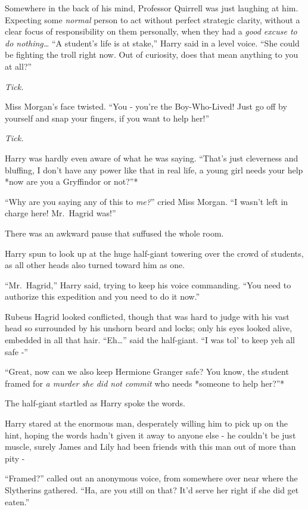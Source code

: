 Somewhere in the back of his mind, Professor Quirrell was just laughing
at him. Expecting some \emph{normal} person to act without perfect
strategic clarity, without a clear focus of responsibility on them
personally, when they had a \emph{good excuse to do nothing\ldots{}} ``A
student's life is at stake,'' Harry said in a level voice. ``She could
be fighting the troll right now. Out of curiosity, does that mean
anything to you at all?''

\emph{Tick.}

Miss Morgan's face twisted. ``You - you're the Boy-Who-Lived! Just go
off by yourself and snap your fingers, if you want to help her!''

\emph{Tick.}

Harry was hardly even aware of what he was saying. ``That's just
cleverness and bluffing, I don't have any power like that in real life,
a young girl needs your help *now are you a Gryffindor or not?''*

``Why are you saying any of this to \emph{me?}'' cried Miss Morgan. ``I
wasn't left in charge here! Mr.~Hagrid was!''

There was an awkward pause that suffused the whole room.

Harry spun to look up at the huge half-giant towering over the crowd of
students, as all other heads also turned toward him as one.

``Mr.~Hagrid,'' Harry said, trying to keep his voice commanding. ``You
need to authorize this expedition and you need to do it now.''

Rubeus Hagrid looked conflicted, though that was hard to judge with his
vast head so surrounded by his unshorn beard and locks; only his eyes
looked alive, embedded in all that hair. ``Eh\ldots{}'' said the
half-giant. ``I was tol' to keep yeh all safe -''

``Great, now can we also keep Hermione Granger safe? You know, the
student framed for \emph{a murder she did not commit} who needs *someone
to help her?''*

The half-giant startled as Harry spoke the words.

Harry stared at the enormous man, desperately willing him to pick up on
the hint, hoping the words hadn't given it away to anyone else - he
couldn't be just muscle, surely James and Lily had been friends with
this man out of more than pity -

``Framed?'' called out an anonymous voice, from somewhere over near
where the Slytherins gathered. ``Ha, are you still on that? It'd serve
her right if she did get eaten.''

